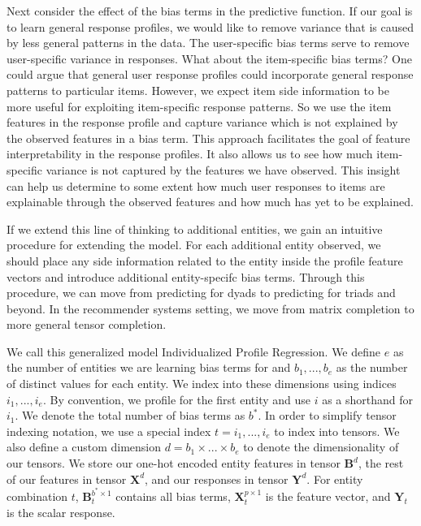 \documentclass[10pt]{proc}
\begin{document}
Next consider the effect of the bias terms in the predictive function. If our
goal is to learn general response profiles, we would like to remove variance
that is caused by less general patterns in the data. The user-specific bias
terms serve to remove user-specific variance in responses. What about the
item-specific bias terms? One could argue that general user response profiles
could incorporate general response patterns to particular items. However, we
expect item side information to be more useful for exploiting item-specific
response patterns. So we use the item features in the response profile and
capture variance which is not explained by the observed features in a bias term.
This approach facilitates the goal of feature interpretability in the response
profiles. It also allows us to see how much item-specific variance is not
captured by the features we have observed. This insight can help us determine to
some extent how much user responses to items are explainable through the
observed features and how much has yet to be explained.

If we extend this line of thinking to additional entities, we gain an intuitive
procedure for extending the model. For each additional entity observed, we
should place any side information related to the entity inside the profile
feature vectors and introduce additional entity-specifc bias terms. Through this
procedure, we can move from predicting for dyads to predicting for triads and
beyond. In the recommender systems setting, we move from matrix completion to
more general tensor completion.

We call this generalized model Individualized Profile Regression.  We define $e$
as the number of entities we are learning bias terms for and $b_1, ..., b_e$ as
the number of distinct values for each entity. We index into these dimensions
using indices $i_1, ..., i_e$. By convention, we profile for the first entity
and use $i$ as a shorthand for $i_1$.  We denote the total number of bias terms
as $b^*$. In order to simplify tensor indexing notation, we use a special index
$t = i_1, ..., i_e$ to index into tensors. We also define a custom dimension $d
= b_1 \times ... \times b_e$ to denote the dimensionality of our tensors. We
store our one-hot encoded entity features in tensor $\bm{B}^d$, the rest of our
features in tensor $\bm{X}^d$, and our responses in tensor $\bm{Y}^d$. For
entity combination $t$, $\bm{B}_t^{b^* \times 1}$ contains all bias terms,
$\bm{X}_t^{p \times 1}$ is the feature vector, and $\bm{Y}_t$ is the scalar
response.
\end{document}
